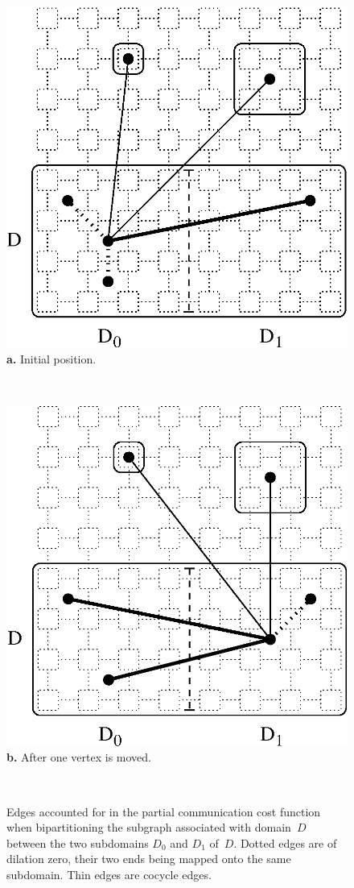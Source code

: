 \begin{figure}[hbt]
\hfill
\parbox[b]{4.9cm}{
\hfill
\includegraphics[scale=0.40]{s_f_rua.eps}
\hfill\\
{\bf a.} Initial position.
}\ \hfill\
\parbox[b]{4.9cm}{
\hfill
\includegraphics[scale=0.40]{s_f_rub.eps}
\hfill\\
{\bf b.} After one vertex is moved.
}\hfill\
\caption%
{Edges accounted for in the partial communication cost function when
 bipartitioning the subgraph associated with domain~$D$ between
 the two subdomains $D_0$ and $D_1$ of~$D$.
 Dotted edges are of dilation zero, their two ends being mapped onto the
 same subdomain. Thin edges are cocycle edges.}
\label{fig-bipcost}
\end{figure}

